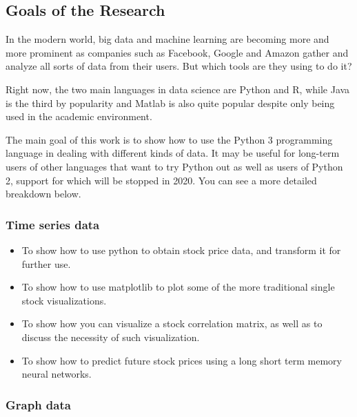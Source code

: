 \documentclass[12pt, a4paper]{article}
\begin{document}
\subsection{Goals of the Research}
In the modern world, big data and machine learning are becoming more and more prominent as companies such as Facebook, Google and Amazon gather and analyze all sorts of data from their users. But which tools are they using to do it?

Right now, the two main languages in data science are Python \cite{popularlanguages} and R, while Java is the third by popularity and Matlab is also quite popular despite only being used in the academic environment.

The main goal of this work is to show how to use the Python 3 programming language in dealing with different kinds of data. It may be useful for long-term users of other languages that want to try Python out as well as users of Python 2, support for which will be stopped in 2020. You can see a more detailed breakdown below.

\subsubsection{Time series data}

\begin{itemize}
\item To show how to use python to obtain stock price data, and transform it for further use.
\item To show how to use matplotlib to plot some of the more traditional single stock visualizations.
\item To show how you can visualize a stock correlation matrix, as well as to discuss the necessity of such visualization.
\item To show how to predict future stock prices using a long short term memory neural networks.
\end{itemize}

\subsubsection{Graph data}
\end{document}
